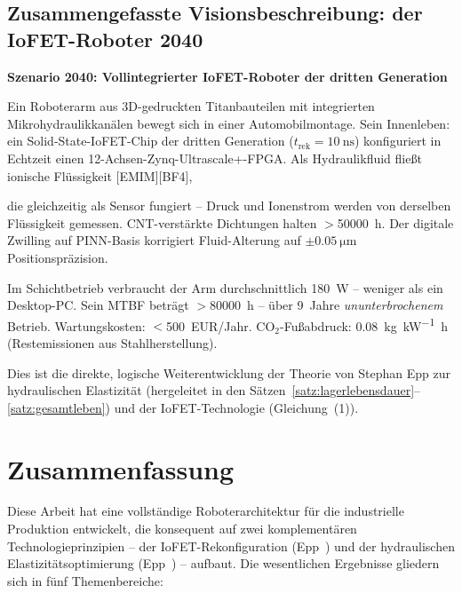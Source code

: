 ﻿\documentclass[a4paper,12pt]{scrreprt}
\theoremstyle{definition}
\begin{document}
\subsection{Zusammengefasste Visionsbeschreibung: der IoFET-Roboter 2040}

\begin{mdframed}[style=infoboxstyle]
\textbf{Szenario 2040: Vollintegrierter IoFET-Roboter der dritten Generation}

\medskip
Ein Roboterarm aus 3D-gedruckten Titanbauteilen mit integrierten
Mikrohydraulikkanälen bewegt sich in einer Automobilmontage.
Sein Innenleben: ein Solid-State-IoFET-Chip der dritten Generation
($t_{\text{rek}} = \SI{10}{\nano\second}$) konfiguriert in Echtzeit
einen 12-Achsen-Zynq-Ultrascale+-FPGA.
Als Hydraulikfluid fließt ionische Flüssigkeit [EMIM][BF4],\medskip

\noindent die gleichzeitig als Sensor fungiert -- Druck und
Ionenstrom werden von derselben Flüssigkeit gemessen.
CNT-verstärkte Dichtungen halten $>$\SI{50000}{\hour}.
Der digitale Zwilling auf PINN-Basis korrigiert Fluid-Alterung
auf $\pm\SI{0.05}{\micro\meter}$ Positionspräzision.\medskip

\noindent Im Schichtbetrieb verbraucht der Arm durchschnittlich
\SI{180}{\watt} -- weniger als ein Desktop-PC.
Sein MTBF beträgt $>$\SI{80000}{\hour} -- über 9~Jahre
\emph{ununterbrochenem} Betrieb.
Wartungskosten: $<$500~EUR/Jahr.
CO$_2$-Fußabdruck: \SI{0.08}{\kilo\gram\per\kilo\watt\hour}
(Restemissionen aus Stahlherstellung).

\medskip
\noindent Dies ist die direkte, logische Weiterentwicklung der
Theorie von Stephan Epp zur hydraulischen Elastizität
(hergeleitet in den Sätzen~\ref{satz:lagerlebensdauer}--\ref{satz:gesamtleben})
und der IoFET-Technologie (Gleichung~(1)).
\end{mdframed}

\section{Zusammenfassung}

Diese Arbeit hat eine vollständige Roboterarchitektur für die
industrielle Produktion entwickelt, die konsequent auf zwei
komplementären Technologieprinzipien -- der IoFET-Rekonfiguration
(Epp~\cite{iono2026}) und der hydraulischen Elastizitätsoptimierung
(Epp~\cite{hydr2026}) -- aufbaut. Die wesentlichen Ergebnisse gliedern
sich in fünf Themenbereiche:
\end{document}
